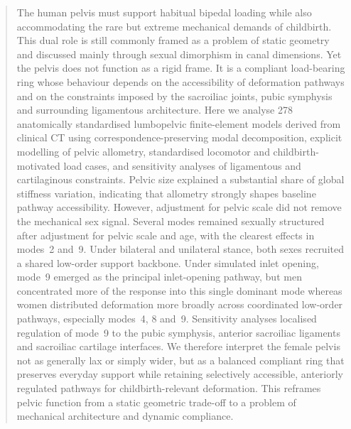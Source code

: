 \documentclass[openacc]{rsproca_new}
\begin{document}
\begin{abstract}
The human pelvis must support habitual bipedal loading while also accommodating the rare but extreme mechanical demands of childbirth. This dual role is still commonly framed as a problem of static geometry and discussed mainly through sexual dimorphism in canal dimensions. Yet the pelvis does not function as a rigid frame. It is a compliant load-bearing ring whose behaviour depends on the accessibility of deformation pathways and on the constraints imposed by the sacroiliac joints, pubic symphysis and surrounding ligamentous architecture. Here we analyse 278 anatomically standardised lumbopelvic finite-element models derived from clinical CT using correspondence-preserving modal decomposition, explicit modelling of pelvic allometry, standardised locomotor and childbirth-motivated load cases, and sensitivity analyses of ligamentous and cartilaginous constraints. Pelvic size explained a substantial share of global stiffness variation, indicating that allometry strongly shapes baseline pathway accessibility. However, adjustment for pelvic scale did not remove the mechanical sex signal. Several modes remained sexually structured after adjustment for pelvic scale and age, with the clearest effects in modes~2 and~9. Under bilateral and unilateral stance, both sexes recruited a shared low-order support backbone. Under simulated inlet opening, mode~9 emerged as the principal inlet-opening pathway, but men concentrated more of the response into this single dominant mode whereas women distributed deformation more broadly across coordinated low-order pathways, especially modes~4, 8 and~9. Sensitivity analyses localised regulation of mode~9 to the pubic symphysis, anterior sacroiliac ligaments and sacroiliac cartilage interfaces. We therefore interpret the female pelvis not as generally lax or simply wider, but as a balanced compliant ring that preserves everyday support while retaining selectively accessible, anteriorly regulated pathways for childbirth-relevant deformation. This reframes pelvic function from a static geometric trade-off to a problem of mechanical architecture and dynamic compliance.
\end{abstract}

\maketitle
\end{document}
